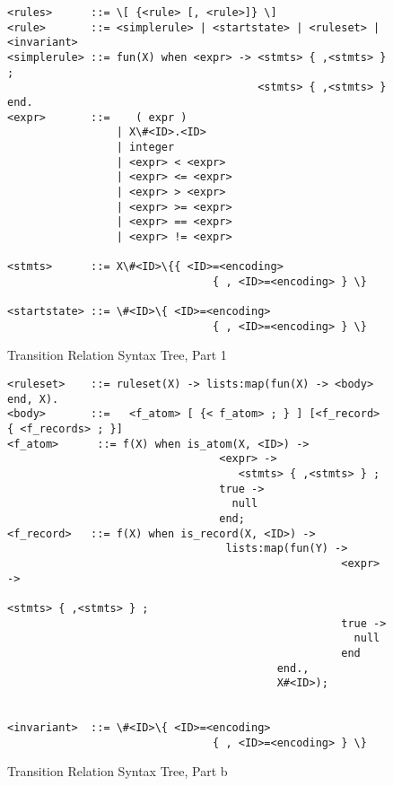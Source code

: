 \begin{figure}
\begin{verbatim}
<rules>      ::= \[ {<rule> [, <rule>]} \]
<rule>       ::= <simplerule> | <startstate> | <ruleset> | <invariant> 
<simplerule> ::= fun(X) when <expr> -> <stmts> { ,<stmts> } ; 
                                       <stmts> { ,<stmts> } end.  
<expr>       ::=    ( expr )
	             | X\#<ID>.<ID>
	             | integer
	             | <expr> < <expr>
	             | <expr> <= <expr>
	             | <expr> > <expr>
	             | <expr> >= <expr>
	             | <expr> == <expr>
	             | <expr> != <expr>

<stmts>      ::= X\#<ID>\{{ <ID>=<encoding> 
                                { , <ID>=<encoding> } \}

<startstate> ::= \#<ID>\{ <ID>=<encoding> 
                                { , <ID>=<encoding> } \}
\end{verbatim}
\caption{Transition Relation Syntax Tree, Part 1}
\label{TRsta}
\end{figure}
\begin{figure}
\begin{verbatim}
<ruleset>    ::= ruleset(X) -> lists:map(fun(X) -> <body> end, X).
<body>       ::=   <f_atom> [ {< f_atom> ; } ] [<f_record> { <f_records> ; }] 
<f_atom>      ::= f(X) when is_atom(X, <ID>) ->
                                 <expr> -> 
                                    <stmts> { ,<stmts> } ;  
                                 true ->
                                   null
                                 end; 
<f_record>   ::= f(X) when is_record(X, <ID>) ->
                                  lists:map(fun(Y) -> 
                                                    <expr> -> 
                                                       <stmts> { ,<stmts> } ;  
                                                    true ->
                                                      null
                                                    end 
                                          end., 
                                          X#<ID>);
  

<invariant>  ::= \#<ID>\{ <ID>=<encoding> 
                                { , <ID>=<encoding> } \}
\end{verbatim}
\caption{Transition Relation Syntax Tree, Part b}
\label{TRstb}
\end{figure}

